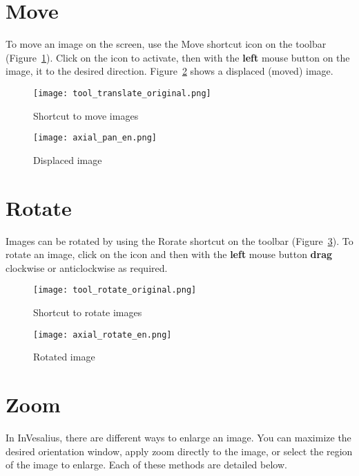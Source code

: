 \section{Move}

To move an image on the screen, use the Move shortcut icon on the toolbar (Figure~\ref{fig:move_icon}). Click on the icon to activate, then with the \textbf{left} mouse button on the image,  it to the desired direction. Figure~\ref{fig:move_img} shows a displaced (moved) image.

\begin{figure}[!htb]
\centering
\texttt{[image: tool\_translate\_original.png]}
\caption{Shortcut to move images}
\label{fig:move_icon}
\end{figure}

\begin{figure}[!htb]
\centering
\texttt{[image: axial\_pan\_en.png]}
\caption{Displaced image}
\label{fig:move_img}
\end{figure}

\section{Rotate}

Images can be rotated by using the Rorate shortcut on the toolbar (Figure~\ref{fig:rot_icon}). To rotate an image, click on the icon and then with the \textbf{left} mouse button \textbf{drag} clockwise or anticlockwise as required.

\begin{figure}[!htb]
\centering
\texttt{[image: tool\_rotate\_original.png]}
\caption{Shortcut to rotate images}
\label{fig:rot_icon}
\end{figure}

\begin{figure}[!htb]
\centering
\texttt{[image: axial\_rotate\_en.png]}
\caption{Rotated image}
\label{fig:rotate_all}
\end{figure}


\section{Zoom}

In InVesalius, there are different ways to enlarge an image. You can maximize the desired orientation window, apply zoom directly to the image, or select the region of the image to enlarge. Each of these methods are detailed below.

